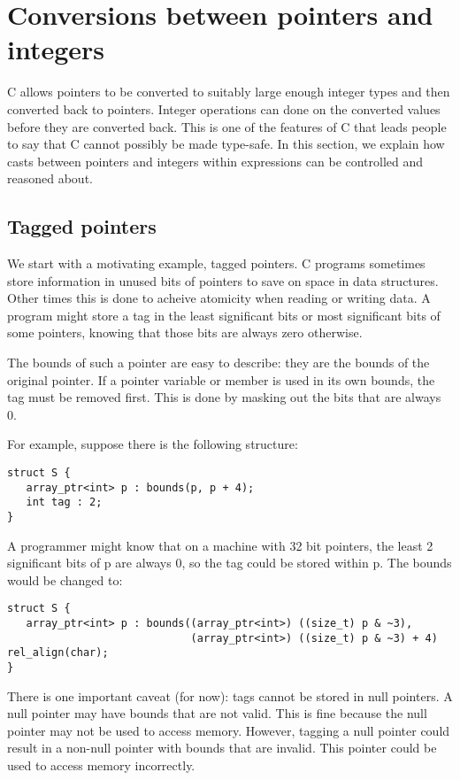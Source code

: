 \section{Conversions between pointers and integers}
\label{section:pointer-integer-conversions}

C allows pointers to be converted to suitably large enough integer
types and then converted back to pointers.  Integer operations can
done on the converted values before they are converted back.
This is one of the features of C that leads people to 
say that C cannot possibly be made type-safe.  In this section,
we explain how casts between pointers and integers within 
expressions can be controlled and reasoned about.

\subsection{Tagged pointers}
We start with a motivating example, tagged pointers.
C programs sometimes store information in unused bits of pointers
to save on space in data structures.  Other times this is done
to acheive atomicity when reading or writing data.  A
program might store a tag in the least significant bits or most
significant bits of some pointers, knowing that those bits are always
zero otherwise.

The bounds of such a pointer are easy to describe: they are the bounds
of the original pointer. If a pointer variable or member is used in its
own bounds, the tag must be removed first. This is
done by masking out the bits that are always 0.

For example, suppose there is the following structure:

\begin{verbatim}
struct S {
   array_ptr<int> p : bounds(p, p + 4);
   int tag : 2;
}
\end{verbatim}

A programmer might know that on a machine with 32 bit pointers, the
least 2 significant bits of p are always 0, so the tag could be stored
within p. The bounds would be changed to:

\begin{verbatim}
struct S {
   array_ptr<int> p : bounds((array_ptr<int>) ((size_t) p & ~3), 
                             (array_ptr<int>) ((size_t) p & ~3) + 4) rel_align(char);
}
\end{verbatim}

There is one important caveat (for now): tags cannot be stored in null pointers. A
null pointer may have bounds that are not valid. This is fine because
the null pointer may not be used to access memory. However, tagging a
null pointer could result in a non-null pointer with bounds that are
invalid. This pointer could be used to access memory incorrectly.

